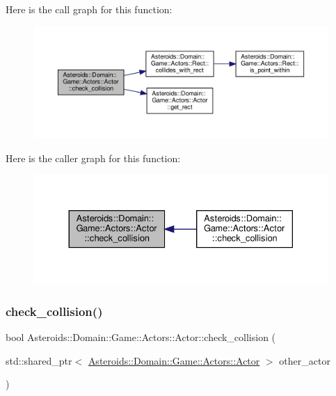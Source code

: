Here is the call graph for this function\+:\nopagebreak
\begin{figure}[H]
\begin{center}
\leavevmode
\includegraphics[width=350pt]{classAsteroids_1_1Domain_1_1Game_1_1Actors_1_1Actor_a80d8992f00d8e0056d0287e6076c22a4_cgraph}
\end{center}
\end{figure}
Here is the caller graph for this function\+:\nopagebreak
\begin{figure}[H]
\begin{center}
\leavevmode
\includegraphics[width=330pt]{classAsteroids_1_1Domain_1_1Game_1_1Actors_1_1Actor_a80d8992f00d8e0056d0287e6076c22a4_icgraph}
\end{center}
\end{figure}
\mbox{\label{classAsteroids_1_1Domain_1_1Game_1_1Actors_1_1Actor_aa9baec5098ef0bcc7bb8675881919c7f}} 
\subsubsection{\texorpdfstring{check\+\_\+collision()}{check\_collision()}\hspace{0.1cm}{\footnotesize\ttfamily [2/2]}}
{\footnotesize\ttfamily bool Asteroids\+::\+Domain\+::\+Game\+::\+Actors\+::\+Actor\+::check\+\_\+collision (\begin{DoxyParamCaption}\item[{std\+::shared\+\_\+ptr$<$ \hyperlink{classAsteroids_1_1Domain_1_1Game_1_1Actors_1_1Actor}{Asteroids\+::\+Domain\+::\+Game\+::\+Actors\+::\+Actor} $>$}]{other\+\_\+actor }\end{DoxyParamCaption})}




